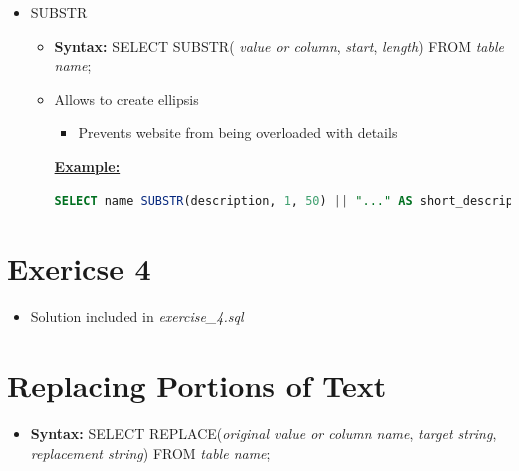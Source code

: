 \documentclass[12pt]{article}
\begin{document}
\begin{itemize}
    \item SUBSTR
    \begin{itemize}
        \item \textbf{Syntax:} SELECT SUBSTR( \textit{value or column}, \textit{start}, \textit{length}) FROM \textit{table name};
        \item Allows to create ellipsis
        \begin{itemize}
            \item Prevents website from being overloaded with details
        \end{itemize}

        \bigskip

        \underline{\textbf{Example:}}

        \bigskip

    \begin{lstlisting}[language=SQL]
    SELECT name SUBSTR(description, 1, 50) || "..." AS short_description, price FROM products;
    \end{lstlisting}

    \end{itemize}
\end{itemize}

\bigskip

\section{Exericse 4}

\bigskip

\begin{itemize}
    \item Solution included in \textit{exercise\_4.sql}
\end{itemize}

\bigskip

\section{Replacing Portions of Text}

\bigskip

\begin{itemize}
    \item \textbf{Syntax:} SELECT REPLACE(\textit{original value or column name}, \textit{target string}, \textit{replacement string}) FROM \textit{table name};
\end{itemize}
\end{document}

